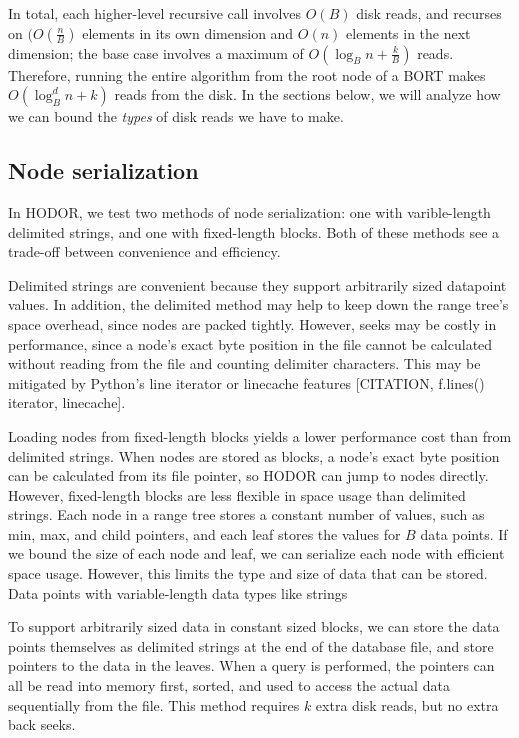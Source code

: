 \documentclass[11pt, oneside]{article}
\begin{document}
In total, each higher-level recursive call involves $O(B)$ disk reads, and
recurses on $(O(\frac{n}{B})$ elements in its own dimension and $O(n)$ elements
in the next dimension; the base case involves a maximum of $O(\log_B n +
\frac{k}{B})$ reads. Therefore, running the entire algorithm from the root node
of a BORT makes $O(\log_B^d n + k)$ reads from the disk. In the sections below,
we will analyze how we can bound the \textit{types} of disk reads we have to
make.

\subsection{Node serialization}

In HODOR, we test two methods of node serialization: one with varible-length 
delimited strings, and one with fixed-length blocks. Both of these methods see a
trade-off between convenience and efficiency. 

Delimited strings are convenient because they support arbitrarily sized
datapoint values. In addition, the delimited method may help to keep down the
range tree's space overhead, since nodes are packed tightly. However, seeks may
be costly in performance, since a node's exact byte position in the file cannot
be calculated without reading from the file and counting delimiter characters.
This may be mitigated by Python's line iterator or linecache features
[CITATION, f.lines() iterator, linecache]. 

Loading nodes from fixed-length blocks yields a lower performance cost than
from delimited strings. When nodes are stored as blocks, a node's exact byte
position can be calculated from its file pointer, so HODOR can jump to nodes
directly. However, fixed-length blocks are less flexible in space usage than
delimited strings. Each node in a range tree stores a constant number of
values, such as min, max, and child pointers, and each leaf stores the values
for $B$ data points. If we bound the size of each node and leaf, we can
serialize each node with efficient space usage. However, this limits the type
and size of data that can be stored. Data points with variable-length data types
like strings

To support arbitrarily sized data in constant sized blocks, we can store the
data points themselves as delimited strings at the end of the database file, and
store pointers to the data in the leaves. When a query is performed, the
pointers can all be read into memory first, sorted, and used to access the
actual data sequentially from the file. This method requires $k$ extra disk
reads, but no extra back seeks.
\end{document}
